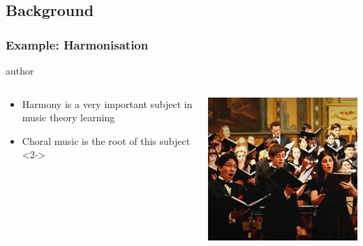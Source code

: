 \documentclass[english,fragile]{beamer}
\begin{document}
\subsection{Background}
\begin{frame}
	\frametitle{Example: Harmonisation}
			\begin{beamercolorbox}[leftskip=8cm,center,wd=0.7\textwidth]{author}
			\begin{columns}[T]
			\begin{column}{.60\textwidth}%
\begin{itemize}
		\item \alert{Harmony} is a very important subject in music theory learning
		\item \alert{Choral} music is the root of this subject
		<2->
	\end{itemize}
			\end{column}
			\begin{column}{.39\textwidth}%
			\includegraphics[width=\linewidth]{imagenes/tsjsu_choir_02.jpg}
			\end{column}
			\end{columns}
			\end{beamercolorbox}
	
\end{frame}
\end{document}
